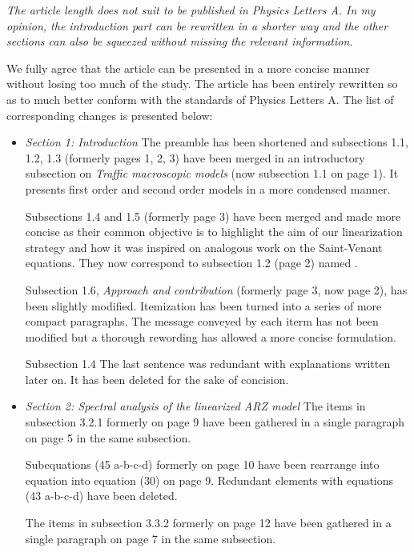 \documentclass{article}
\begin{document}
\bigskip{}

\emph{
The article length does not suit to be published in Physics Letters A. In my opinion, the introduction part can be rewritten in a shorter way and the other sections can also be squeezed without missing the relevant information.
}

We fully agree that the article can be presented in a more concise manner without losing too much of the study. The article has been entirely rewritten so as to much better conform with the standards of Physics Letters A. The list of corresponding changes is presented below:
\begin{itemize}
\item
\emph{Section 1: Introduction}
The preamble has been shortened and subsections 1.1, 1.2, 1.3 (formerly pages 1, 2, 3) have been merged in an introductory subsection on \textit{Traffic macroscopic models} (now subsection 1.1 on page 1). It presents first order and second order models in a more condensed manner.

Subsections 1.4 and 1.5 (formerly page 3) have been merged and made more concise as their common objective is to highlight the aim of our linearization strategy and how it was inspired on analogous work on the Saint-Venant equations. They now correspond to subsection 1.2 (page 2) named .

Subsection 1.6, \textit{Approach and contribution} (formerly page 3, now page 2), has been slightly modified. Itemization has been turned into a series of more compact paragraphs. The message conveyed by each iterm has not been modified but a thorough rewording has allowed a more concise formulation.

Subsection 1.4 The last sentence was redundant with explanations written later on. It has been deleted for the sake of concision.

\item
\emph{Section 2: Spectral analysis of the linearized ARZ model}
The items in subsection 3.2.1 formerly on page 9 have been gathered in a single paragraph on page 5 in the same subsection. 

Subequations (45 a-b-c-d) formerly on page 10 have been rearrange into equation into equation (30) on page 9. Redundant elements with equations (43 a-b-c-d) have been deleted.

The items in subsection 3.3.2 formerly on page 12 have been gathered in a single paragraph on page 7 in the same subsection. 


\end{itemize}
\end{document}
